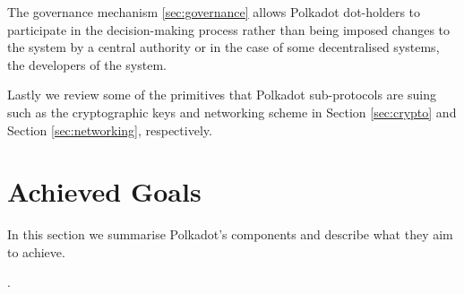 The governance mechanism \ref{sec:governance} allows Polkadot dot-holders to participate in the decision-making process rather than being imposed changes to the system by a central authority or in the case of some decentralised systems, the developers of the system. 

Lastly we review some of the primitives that Polkadot sub-protocols are suing such as the cryptographic keys and networking scheme in Section \ref{sec:crypto} and Section \ref{sec:networking}, respectively. %

















\section{Achieved Goals}\label{sec:summary}
In this section we summarise Polkadot's components and describe what they aim to achieve. 



 

 . 



  



